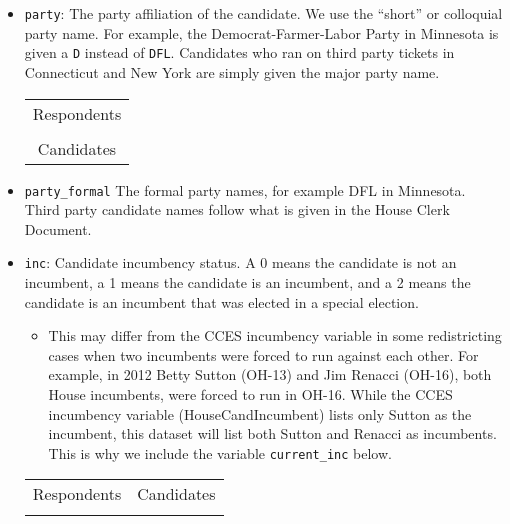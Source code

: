 \documentclass[12pt]{article}
\begin{document}
\begin{itemize}[leftmargin=*]
\item \texttt{party}: The party affiliation of the candidate. We use the ``short'' or colloquial party name. For example, the Democrat-Farmer-Labor Party in Minnesota is given a \texttt{D} instead of \texttt{DFL}. Candidates who ran on third party tickets in Connecticut and New York are simply given the major party name.   %



\begin{tabularx}{\linewidth}{C}
  Respondents\\
  \\\addlinespace
  Candidates\\
  
\end{tabularx}

\item \texttt{party\_formal} The formal party names, for example DFL in Minnesota. Third party candidate names follow what is given in the House Clerk Document. 

\item \texttt{inc}: Candidate incumbency status. A 0 means the candidate is not an incumbent, a 1 means the candidate is an incumbent, and a 2 means the candidate is an incumbent that was elected in a special election. 
\begin{itemize}
\item This may differ from the CCES incumbency variable in some redistricting cases when two incumbents were forced to run against each other. For example, in 2012 Betty Sutton (OH-13) and Jim Renacci (OH-16), both House incumbents, were forced to run in OH-16. While the CCES incumbency variable (HouseCandIncumbent) lists only Sutton as the incumbent, this dataset will list both Sutton and Renacci as incumbents. This is why we include the variable  \texttt{current\_inc} below.  
\end{itemize}

    \begin{tabularx}{\linewidth}{CC}
    Respondents & Candidates\\
     & 
    
    \end{tabularx}


\end{itemize}
\end{document}
